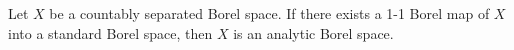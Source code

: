 Let $X$ be a countably separated Borel space. If there exists a 1-1 Borel map of $X$ into a standard Borel space, then $X$ is an analytic Borel space.
